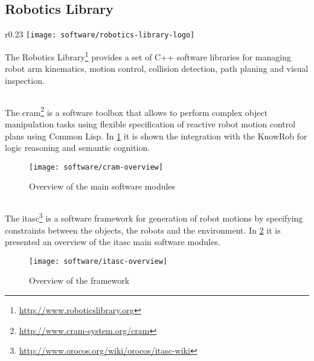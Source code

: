 \subsection{Robotics Library}

\begin{wrapfigure}{r}{0.23\textwidth}
	\centering
	\vspace*{-2em}
	\texttt{[image: software/robotics-library-logo]}
	\caption{Robotics Library logo}
	\label{fig:robotics-library-logo}
\end{wrapfigure}

The Robotics Library\footnote{\url{http://www.roboticslibrary.org}} provides a set of C++ software libraries for managing robot arm kinematics, motion control, collision detection, path planing and visual inspection.


\subsection{}

The \gls{cram}\footnote{\url{http://www.cram-system.org/cram}} \cite{Beetz2010} is a software toolbox that allows to perform complex object manipulation tasks using flexible specification of reactive robot motion control plans using Common Lisp. In \cref{fig:cram-overview} it is shown the integration with the KnowRob for logic reasoning and semantic cognition.

\begin{figure}[H]
	\centering
	\texttt{[image: software/cram-overview]}
	\caption{Overview of the  main software modules}
	\label{fig:cram-overview}
\end{figure}


\subsection{}

The \gls{itasc}\footnote{\url{http://www.orocos.org/wiki/orocos/itasc-wiki}} \cite{DeSchutter-ijrr2007} is a software framework for generation of robot motions by specifying constraints between the objects, the robots and the environment. In \cref{fig:itasc-overview} it is presented an overview of the \gls{itasc} main software modules.

\begin{figure}[H]
	\centering
	\texttt{[image: software/itasc-overview]}
	\caption[Overview of the  framework]{Overview of the  framework\protect\footnotemark}
	\label{fig:itasc-overview}
\end{figure}





